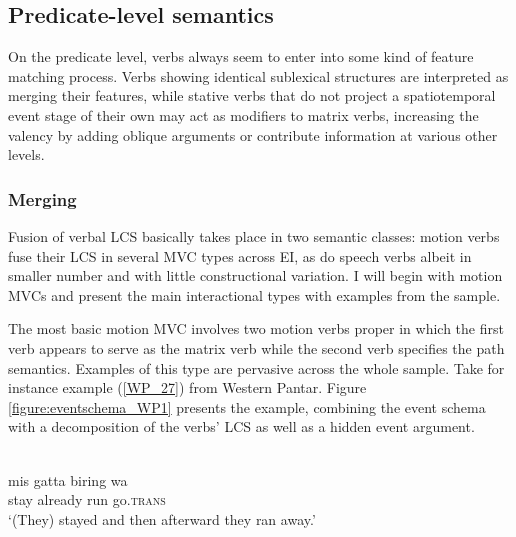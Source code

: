 \subsection{Predicate-level semantics} \label{sec:predicate-level}

On the predicate level, verbs always seem to enter into some kind of feature matching process. Verbs showing identical sublexical structures are interpreted as merging their features, while stative verbs that do not project a spatiotemporal event stage of their own may act as modifiers to matrix verbs, increasing the valency by adding oblique arguments or contribute information at various other levels.

\subsubsection{Merging}
\label{sec:merging}

Fusion of verbal LCS basically takes place in two semantic classes: motion verbs fuse their LCS in several MVC types across EI, as do speech verbs albeit in smaller number and with little constructional variation. I will begin with motion MVCs and present the main interactional types with examples from the sample.

The most basic motion MVC involves two motion verbs proper in which the first verb appears to serve as the matrix verb while the second verb specifies the path semantics. Examples of this type are pervasive across the whole sample. Take for instance example (\ref{WP_27}) from Western Pantar. Figure \ref{figure:eventschema_WP1} presents the example, combining the event schema with a decomposition of the verbs' LCS as well as a hidden event argument.

\ea \label{WP_27}
\\
\gll mis gatta biring wa \\
stay already run go.\textsc{trans} \\
\glft `(They) stayed and then afterward they ran away.' \\ 
\z

